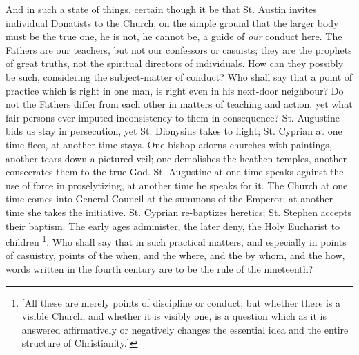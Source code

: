 And in such a state of things, certain though it be that St. Austin
invites individual Donatists to the Church, on the simple ground
that the larger body must be the true one, he is not, he cannot be, a
guide of \emph{our} conduct here. The Fathers are our teachers, but
not our confessors or casuists; they are the prophets of great truths,
not the spiritual directors of individuals. How can they possibly be
such, considering the subject-matter of conduct? Who shall say that a
point of practice which is right in one man, is right even in his
next-door neighbour? Do not the Fathers differ from each other in
matters of teaching and action, yet what fair persons ever imputed
inconsistency to them in consequence? St. Augustine bids us stay in
persecution, yet St. Dionysius takes to flight; St. Cyprian at one
time flees, at another time stays. One bishop adorns churches with
paintings, another tears down a pictured veil; one demolishes the
heathen temples, another consecrates them to the true God. St.
Augustine at one time speaks against the use of force in
proselytizing, at another time he speaks for it. The Church at one
time comes into General Council at the summons of the Emperor; at
another time she takes the initiative. St. Cyprian re-baptizes
heretics; St. Stephen accepts their baptism. The early ages
administer, the later deny, the Holy Eucharist to children \footnote{[All these are
merely points of discipline or conduct; but whether there is a visible
Church, and whether it is visibly one, is a question which as it is
answered affirmatively or negatively changes the essential idea and
the entire structure of Christianity.]}. Who shall say that in such practical matters, and especially
in points of casuistry, points of the when, and the where, and the by
whom, and the how, words written in the fourth century are to be the
rule of the nineteenth?

